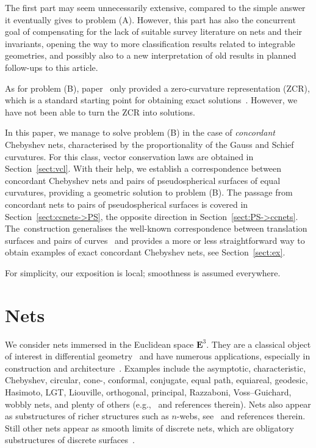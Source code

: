 \documentclass[pdftex]{sigma}
\let\ve\mathbf
\numberwithin{equation}{section}
\begin{document}
The first part may seem unnecessarily extensive,
compared to the simple answer it eventually gives to problem (A).
However, this part has also the concurrent goal of compensating for the lack of
suitable survey literature on nets and their invariants, opening the way to more
classification results related to integrable geometries, and possibly also to a new
interpretation of old results in planned follow-ups to this article.

As for problem (B), paper~\cite{K-M} only provided a zero-curvature representation
(ZCR), which is a standard starting point for obtaining exact solutions~\cite{BAD-1981,VBM-2008}.
However, we have not been able to turn the ZCR into solutions.

In this paper, we manage to solve problem (B) in the case of {\it concordant\/}
Chebyshev nets, characterised by the proportionality of the Gauss and Schief curvatures.
For this class, vector conservation laws are obtained in Section~\ref{sect:vcl}.
With their help, we establish a correspondence between concordant Chebyshev nets
and pairs of pseudospherical surfaces of equal curvatures,
providing a geometric solution to problem (B).
The passage from concordant nets to pairs of pseudospherical surfaces is covered in
Section~\ref{sect:ccnets->PS}, the opposite direction in Section~\ref{sect:PS->ccnets}.
The~construction generalises the well-known correspondence between
translation surfaces and pairs of
curves~\cite{LPE-1909,F-T-2007,K-T-2021,SL-1878}
and
provides a more or less straightforward way to obtain examples of exact concordant
Chebyshev nets, see Section~\ref{sect:ex}.

For simplicity, our exposition is local;
smoothness is assumed everywhere.

\section{Nets}
\label{sect:nets}

We consider nets  immersed in the Euclidean space
$\ve E^3$.
They are a classical object of interest
in differential geometry~\cite{LB-I,LB-II,GD-I,GD-II,GD-III} and
have numerous applications, especially in construction and
architecture~\cite{ENK,M-D-T-F-B,P-E-V-W,XT-2022}.
Examples include the
asymptotic, characteristic, Chebyshev, circular, cone-, conformal, conjugate,
equal path, equiareal, geodesic, Hasimoto, LGT, Liouville, orthogonal, principal,
Razzaboni, Voss--Guichard, wobbly nets,
and plenty of others (e.g.,~\cite{GD-I,YaSD,LPE-1904,BG,GMG,K-M-T,RK-1979,RK-1982,RL-RC,M-D-T-F-B,R-S,RS-1933,RS-1970,V-B-2010,W-P-2022}
and references therein).
Nets also appear as substructures of richer structures such as $n$-webs,
see~\cite{SIA-2021} and references therein.
Still other nets appear as smooth limits of discrete nets,
which are obligatory substructures of discrete surfaces~\cite{AB-UP,B-P-R,B-S}.
\end{document}
